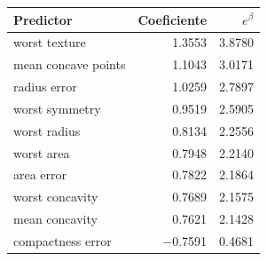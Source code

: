 \begin{tabular}{lrr}
\toprule
Predictor & Coeficiente & $e^{\beta}$ \\
\midrule
worst texture & 1.3553 & 3.8780 \\
mean concave points & 1.1043 & 3.0171 \\
radius error & 1.0259 & 2.7897 \\
worst symmetry & 0.9519 & 2.5905 \\
worst radius & 0.8134 & 2.2556 \\
worst area & 0.7948 & 2.2140 \\
area error & 0.7822 & 2.1864 \\
worst concavity & 0.7689 & 2.1575 \\
mean concavity & 0.7621 & 2.1428 \\
compactness error & $-$0.7591 & 0.4681 \\
\bottomrule
\end{tabular}
